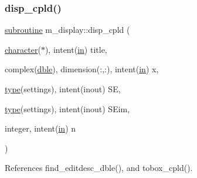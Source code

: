\mbox{\label{namespacem__display_a331e5caf7f78cff8f7e19145001bcdca}} 
\subsubsection{\texorpdfstring{disp\+\_\+cpld()}{disp\_cpld()}}
{\footnotesize\ttfamily \hyperlink{M__stopwatch_83_8txt_acfbcff50169d691ff02d4a123ed70482}{subroutine} m\+\_\+display\+::disp\+\_\+cpld (\begin{DoxyParamCaption}\item[{\hyperlink{option__stopwatch_83_8txt_abd4b21fbbd175834027b5224bfe97e66}{character}($\ast$), intent(\hyperlink{M__journal_83_8txt_afce72651d1eed785a2132bee863b2f38}{in})}]{title,  }\item[{complex(\hyperlink{namespacem__display_a46d90b75b6ccef7ccade133e5847e815}{dble}), dimension(\+:,\+:), intent(\hyperlink{M__journal_83_8txt_afce72651d1eed785a2132bee863b2f38}{in})}]{x,  }\item[{\hyperlink{stop__watch_83_8txt_a70f0ead91c32e25323c03265aa302c1c}{type}(settings), intent(inout)}]{SE,  }\item[{\hyperlink{stop__watch_83_8txt_a70f0ead91c32e25323c03265aa302c1c}{type}(settings), intent(inout)}]{S\+Eim,  }\item[{integer, intent(\hyperlink{M__journal_83_8txt_afce72651d1eed785a2132bee863b2f38}{in})}]{n }\end{DoxyParamCaption})\hspace{0.3cm}{\ttfamily [private]}}



References find\+\_\+editdesc\+\_\+dble(), and tobox\+\_\+cpld().

\mbox{\label{namespacem__display_ae6588ffe4d1d6d1022c0b0017f4f70b7}} 
